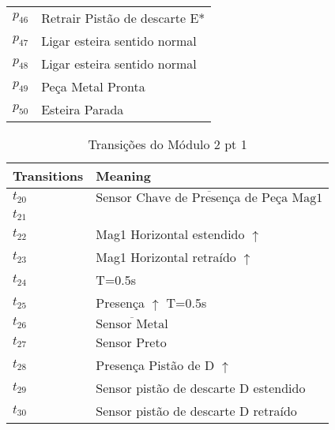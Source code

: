 \begin{table}[htbp]
\begin{tabular}{ll}
\hyperlink{partialNet:p46}{\hypertarget{partialTable:p46}{$p_{46}$}} & Retrair Pistão de descarte E*\\
\hyperlink{partialNet:p47}{\hypertarget{partialTable:p47}{$p_{47}$}} & Ligar esteira sentido normal\\
\hyperlink{partialNet:p48}{\hypertarget{partialTable:p48}{$p_{48}$}} & Ligar esteira sentido normal\\
\hyperlink{partialNet:p49}{\hypertarget{partialTable:p49}{$p_{49}$}} & Peça Metal Pronta\\
\hyperlink{partialNet:p50}{\hypertarget{partialTable:p50}{$p_{50}$}} & Esteira Parada\\
\end{tabular}
\end{table}

\begin{table}[htbp]
\caption{Transições do Módulo 2 pt 1}
\centering
\begin{tabular}{ll}
Transitions & Meaning\\
\hline
\hyperlink{partialNet:t20}{\hypertarget{partialTable:t20}{$t_{20}$}} & \(\overline{\mbox{Sensor Chave de Presença de Peça Mag1}}\)\\
\hyperlink{partialNet:t21}{\hypertarget{partialTable:t21}{$t_{21}$}} & \\
\hyperlink{partialNet:t22}{\hypertarget{partialTable:t22}{$t_{22}$}} & Mag1 Horizontal estendido \(\uparrow\)\\
\hyperlink{partialNet:t23}{\hypertarget{partialTable:t23}{$t_{23}$}} & Mag1 Horizontal retraído \(\uparrow\)\\
\hyperlink{partialNet:tt24}{\hypertarget{partialTable:tt24}{$t_{24}$}} & T=0.5s\\
\hyperlink{partialNet:tt25}{\hypertarget{partialTable:tt25}{$t_{25}$}} & Presença \(\uparrow\) T=0.5s\\
\hyperlink{partialNet:t26}{\hypertarget{partialTable:t26}{$t_{26}$}} & \(\overline{\mbox{Sensor Metal}}\)\\
\hyperlink{partialNet:t27}{\hypertarget{partialTable:t27}{$t_{27}$}} & Sensor Preto\\
\hyperlink{partialNet:t28}{\hypertarget{partialTable:t28}{$t_{28}$}} & Presença Pistão de D \(\uparrow\)\\
\hyperlink{partialNet:t29}{\hypertarget{partialTable:t29}{$t_{29}$}} & Sensor pistão de descarte D estendido\\
\hyperlink{partialNet:t30}{\hypertarget{partialTable:t30}{$t_{30}$}} & Sensor pistão de descarte D retraído\\

\end{tabular}
\end{table}
